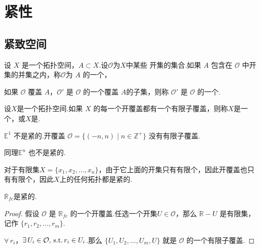 \chapter{紧性}

\section{紧致空间}


\begin{definition}[开覆盖][def:6.1]
    设 $X$ 是一个拓扑空间，$A \subset X$.设$\mathcal{O}$为$X$中某些                                                                                            开集的集合.如果 $A$ 包含在 $\mathcal{O}$ 中开集的并集之内，称$\mathcal{O}$为 $A$ 的一个，
\end{definition}

\begin{definition}[子覆盖][def:6.2]
    如果 $\mathcal{O}$ 覆盖 $A$，$\mathcal{O}'$ 是 $\mathcal{O}$ 的一个覆盖 $A$的子集，则称 $\mathcal{O}'$ 是 $\mathcal{O}$ 的一个.
\end{definition}

\begin{definition}[紧致空间][def:6.3]
    设$X$是一个拓扑空间.如果 $X$ 的每一个开覆盖都有一个有限子覆盖，则称$X$是一个，或$X$是.
\end{definition}

\begin{instance}
    $\mathbb{E}^1$ 不是紧的.开覆盖 $\mathcal{O} = \{(-n, n) \mid n \in \mathbb{Z}^+\}$ 没有有限子覆盖.\par
    同理$\mathbb{E}^n$ 也不是紧的.
\end{instance}

\begin{instance}
    对于有限集$X = \{x_1, x_2, \dots, x_n\}$，由于它上面的开集只有有限个，因此开覆盖也只有有限个，因此$X$上的任何拓扑都是紧的.
\end{instance}

\begin{instance}
    $\mathbb{R}_{fc}$是紧的.
    \begin{proof}
        假设 $\mathcal{O}$ 是 $\mathbb{R}_{fc}$ 的一个开覆盖.任选一个开集$U \in \mathcal{O}$，那么 $\mathbb{R} - U$ 是有限集，记作 $\{r_1, r_2, \dots, r_m\}$.\par
        $\forall\,r_i$，$\exists\,U_i \in \mathcal{O},\operatorname{\,\text{s.t.}} r_i \in U_i$.那么 $\{U_1, U_2, \dots, U_m, U\}$ 就是 $\mathcal{O}$ 的一个有限子覆盖.
    \end{proof}
\end{instance}

